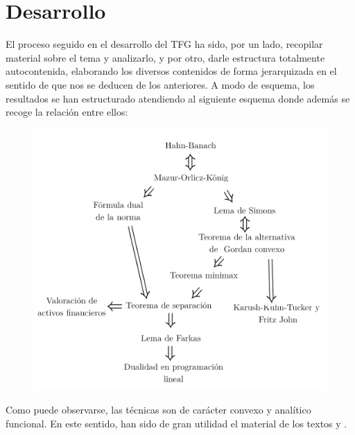 \chapter{Desarrollo}
El proceso seguido en el desarrollo del TFG ha sido, por un lado, recopilar material sobre el tema y analizarlo, y por otro, darle estructura totalmente autocontenida, elaborando los diversos contenidos de forma jerarquizada en el sentido de que nos se deducen de los anteriores. A modo de esquema, los resultados se han estructurado atendiendo al siguiente esquema donde además se recoge la relación entre ellos: 
\begin{figure}[h!]
	\centering
	\includegraphics[width=0.9\linewidth]{imagenes/esquema.png}
	\label{fig:aux2}
\end{figure}

Como puede observarse, las técnicas son de carácter convexo y analítico funcional. En este sentido, han sido de gran utilidad el material de los textos \cite{Simons2008} y \cite{borwein}.
